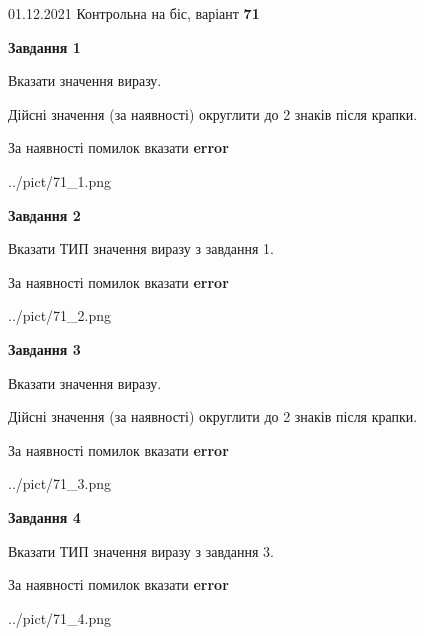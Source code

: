 \documentclass[11pt, ukrainian]{article}
\begin{document}
{01.12.2021 Контрольна на біс, варіант  \No \textbf { 71 }\par}
{
\begin {large}
{\begin {center}\textbf{Завдання 1}\end {center}}\par
Вказати значення виразу. \par
Дійсні значення (за наявності) округлити до 2 знаків після крапки. \par
За наявності помилок вказати \textbf{error}

\begin{center}
	{../pict/71_1.png}
\end{center}
\newpage

{\begin {center}\textbf{Завдання 2}\end {center}}\par
Вказати ТИП значення виразу з завдання 1. \par
За наявності помилок вказати \textbf{error}

\begin{center}
	{../pict/71_2.png}
\end{center}
\newpage

{\begin {center}\textbf{Завдання 3}\end {center}}\par
Вказати значення виразу. \par
Дійсні значення (за наявності) округлити до 2 знаків після крапки. \par
За наявності помилок вказати \textbf{error}

\begin{center}
	{../pict/71_3.png}
\end{center}
\newpage

{\begin {center}\textbf{Завдання 4}\end {center}}\par
Вказати ТИП значення виразу з завдання 3. \par
За наявності помилок вказати \textbf{error}

\begin{center}
	{../pict/71_4.png}
\end{center}
\newpage


\end{large}}
\end{document}
